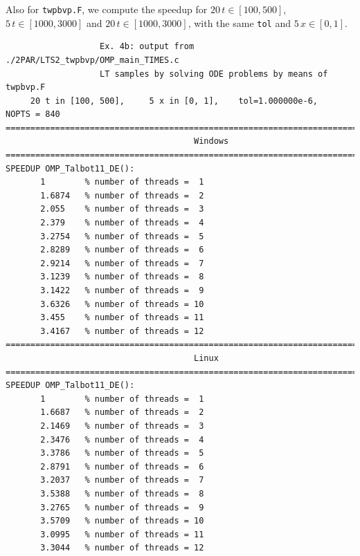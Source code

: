 \documentclass[a4paper,10pt]{report}%
\begin{document}
\noindent Also for {\tt twpbvp.F}, we compute the speedup for $20\,t\in[100,500]$, $5\,t\in[1000,3000]$
and $20\,t\in[1000,3000]$, with the same {\tt tol} and $5\,x\in[0,1]$.
\begin{lstlisting}
                   Ex. 4b: output from ./2PAR/LTS2_twpbvp/OMP_main_TIMES.c
                   LT samples by solving ODE problems by means of twpbvp.F
     20 t in [100, 500],     5 x in [0, 1],    tol=1.000000e-6,    NOPTS = 840
====================================================================================
                                      Windows
====================================================================================
SPEEDUP OMP_Talbot11_DE():
       1        % number of threads =  1
       1.6874   % number of threads =  2
       2.055    % number of threads =  3
       2.379    % number of threads =  4
       3.2754   % number of threads =  5
       2.8289   % number of threads =  6
       2.9214   % number of threads =  7
       3.1239   % number of threads =  8
       3.1422   % number of threads =  9
       3.6326   % number of threads = 10
       3.455    % number of threads = 11
       3.4167   % number of threads = 12
====================================================================================
                                      Linux
====================================================================================
SPEEDUP OMP_Talbot11_DE():
       1        % number of threads =  1
       1.6687   % number of threads =  2
       2.1469   % number of threads =  3
       2.3476   % number of threads =  4
       3.3786   % number of threads =  5
       2.8791   % number of threads =  6
       3.2037   % number of threads =  7
       3.5388   % number of threads =  8
       3.2765   % number of threads =  9
       3.5709   % number of threads = 10
       3.0995   % number of threads = 11
       3.3044   % number of threads = 12


\end{lstlisting}
\end{document}
